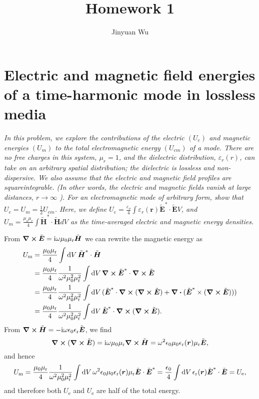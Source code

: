 \documentclass[hyperref, a4paper]{article}
\title{Homework 1}
\author{Jinyuan Wu}
\newcommand*{\ii}{\mathrm{i}}
\newcommand{\epsr}{\epsilon_{\text{r}}}
\newcommand*{\mur}{\mu_{\text{r}}}
\newcommand*{\mvb}[1]{\tilde{\vb*{#1}}}
\begin{document}
\maketitle

\section{Electric and magnetic field energies of a time-harmonic mode in lossless media}

\textit{
In this problem, we explore the contributions of the electric $\left(U_e\right)$ and magnetic energies $\left(U_m\right)$ to the total electromagnetic energy $\left(U_{e m}\right)$ of a mode. There are no free charges in this system, $\mu_r=1$, and the dielectric distribution, $\varepsilon_r(r)$, can take on an arbitrary spatial distribution; the dielectric is lossless and non-dispersive. We also assume that the electric and magnetic field profiles are squareintegrable. (In other words, the electric and magnetic fields vanish at large distances, $r \rightarrow \infty$ ).
For an electromagnetic mode of arbitrary form, show that $U_e=U_m=\frac{1}{2} U_{e m}$. Here, we define $U_e=\frac{\varepsilon_o}{4} \int \varepsilon_r(\mathbf{r}) \tilde{\mathbf{E}}^* \cdot \tilde{\mathbf{E}} V$, and $U_m=\frac{\mu_o \mu_r}{4} \int \tilde{\mathbf{H}}^* \cdot \tilde{\mathbf{H}} d V$ as the time-averaged electric and magnetic energy densities.
}

From $\curl{\mvb{E}} = \ii \omega \mu_0 \mur \mvb{H}$ we can rewrite the magnetic energy as 
\begin{equation}
    \begin{aligned}
        U_{\text{m}} &= \frac{\mu_0 \mur}{4} \int \dd{V} \mvb{H}^* \cdot \mvb{H} \\
        &= \frac{\mu_0 \mur}{4} \frac{1}{\omega^2 \mu_0^2 \mur^2} \int \dd{V} \curl{\mvb{E}^*} \cdot \curl{\mvb{E}} \\
        &= \frac{\mu_0 \mur}{4} \frac{1}{\omega^2 \mu_0^2 \mur^2} \int \dd{V} 
        (\mvb{E}^* \cdot \curl{(\curl{\mvb{E}})} + \div{(\mvb{E}^* \times (\curl{\mvb{E}}))} )\\
        &= \frac{\mu_0 \mur}{4} \frac{1}{\omega^2 \mu_0^2 \mur^2} \int \dd{V} 
        \mvb{E}^* \cdot \curl{(\curl{\mvb{E}})} .
    \end{aligned}
\end{equation}
From $\curl{\mvb{H}} = - \ii \omega \epsilon_0 \epsr \mvb{E}$, we find 
\[
    \curl{(\curl{\mvb{E}})} = \ii \omega \mu_0 \mur \curl{\mvb{H}}
    = \omega^2 \epsilon_0 \mu_0 \epsr(\vb*{r}) \mur \mvb{E}, 
\]
and hence 
\begin{equation}
    U_{\text{m}} = \frac{\mu_0 \mur}{4} \frac{1}{\omega^2 \mu_0^2 \mur^2} \int \dd{V}
    \omega^2 \epsilon_0 \mu_0 \epsr(\vb*{r}) \mur \mvb{E} \cdot \mvb{E}^*
    = \frac{\epsilon_0}{4} \int \dd{V} \epsr(\vb*{r}) \mvb{E}^* \cdot \mvb{E} = U_{\text{e}},
\end{equation}
and therefore both $U_{\text{e}}$ and $U_{\text{e}}$ are half of the total energy.
\end{document}
